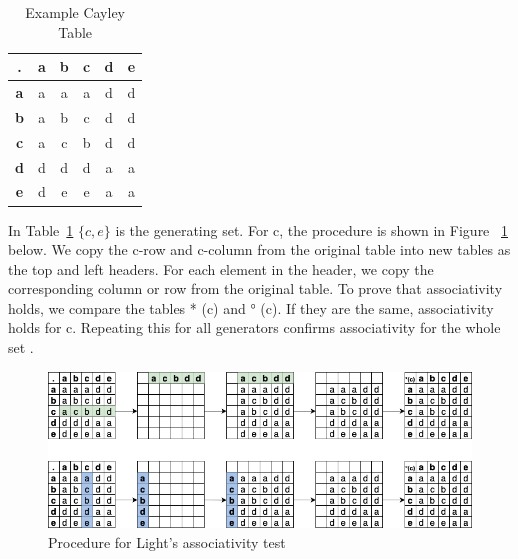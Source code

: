 \documentclass[sigconf]{acmart}
\begin{document}
\begin{table}[h]
\centering
\begin{tabular}{|c|c|c|c|c|c|}
\hline
\textbf{.} & \textbf{a} & \textbf{b} & \textbf{c} & \textbf{d} & \textbf{e} \\ \hline
\textbf{a} & a & a & a & d & d \\ \hline
\textbf{b} & a & b & c & d & d \\ \hline
\textbf{c} & a & c & b & d & d \\ \hline
\textbf{d} & d & d & d & a & a \\ \hline
\textbf{e} & d & e & e & a & a \\ \hline
\end{tabular}
\caption{Example Cayley Table}
\label{tab:example}
\end{table}

In Table~\ref{tab:example} \(\{c,e\}\) is the generating set. For c, the procedure is shown in Figure ~\ref{fig:procedure} below. We copy the c-row and c-column from the original table into new tables as the top and left headers. For each element in the header, we copy the corresponding column or row from the original table. To prove that associativity holds, we compare the tables * (c) and ° (c). If they are the same, associativity holds for c. Repeating this for all generators confirms associativity for the whole set \cite{clifford1961algebraic}.

\begin{figure}[H]
    \centering
    \includegraphics[width=1\linewidth]{Lights.png}
    \caption{Procedure for Light's associativity test}
    \label{fig:procedure}
\end{figure}
\end{document}
